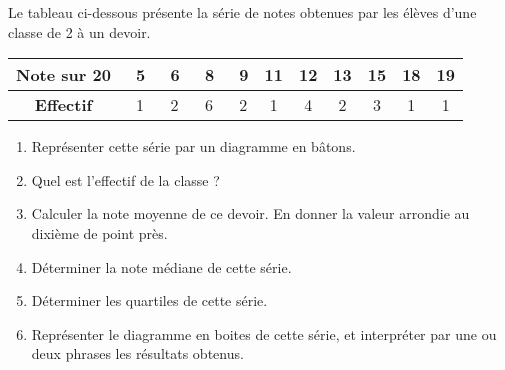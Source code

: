 
\begin{exercice}\label{exosmath-0147}

    Le tableau ci-dessous présente la série de notes obtenues par les
élèves d'une classe de 2  à un devoir.

\begin{center}
  \begin{tabular}{|c|*{10}{c|}}
    \hline
    \textbf{Note sur 20} & \ 5&\ 6&\ 8&\ 9&11&12&13&15&18&19 \\
    \hline
    \textbf{Effectif} & \ 1&\ 2&\ 6&\ 2&1&4&2&3&1&1 \\
    \hline
  \end{tabular}
\end{center}
\medskip

\begin{enumerate}
\item Représenter cette série par un diagramme en bâtons.
\item Quel est l'effectif de la classe ?
\item Calculer la note moyenne de ce devoir. En donner la valeur
  arrondie au dixième de point près.
\item Déterminer la note médiane de cette série.
\item Déterminer les quartiles de cette série.
\item Représenter le diagramme en boites de cette série, et
  interpréter par une ou deux phrases les résultats obtenus.
\end{enumerate}



\end{exercice}
